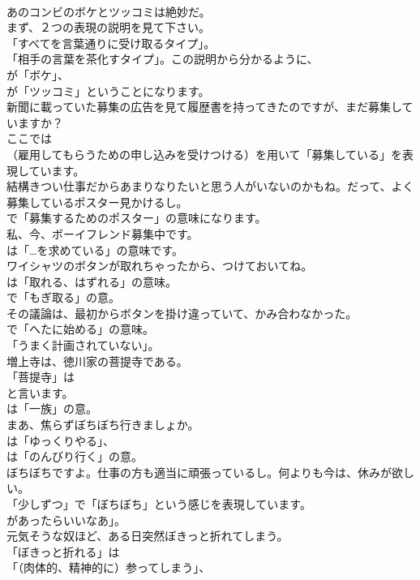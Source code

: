 \documentclass[8pt]{extreport}
\begin{document}
\begin{CJK}{UTF8}{min}
\\	あのコンビのボケとツッコミは絶妙だ。 
\\	まず、２つの表現の説明を見て下さい。
\\	「すべてを言葉通りに受け取るタイプ」。
\\	「相手の言葉を茶化すタイプ」。この説明から分かるように、
\\	が「ボケ」、
\\	が「ツッコミ」ということになります。	
\\	新聞に載っていた募集の広告を見て履歴書を持ってきたのですが、まだ募集していますか？ 
\\	ここでは 
\\	（雇用してもらうための申し込みを受けつける）を用いて「募集している」を表現しています。	
\\	結構きつい仕事だからあまりなりたいと思う人がいないのかもね。だって、よく募集しているポスター見かけるし。 
\\	で「募集するためのポスター」の意味になります。	
\\	私、今、ボーイフレンド募集中です。 
\\	は「…を求めている」の意味です。	
\\	ワイシャツのボタンが取れちゃったから、つけておいてね。 
\\	は「取れる、はずれる」の意味。
\\	で「もぎ取る」の意。	
\\	その議論は、最初からボタンを掛け違っていて、かみ合わなかった。 
\\	で「へたに始める」の意味。
\\	「うまく計画されていない」。	
\\	増上寺は、徳川家の菩提寺である。 
\\	「菩提寺」は
\\	と言います。
\\	は「一族」の意。	
\\	まあ、焦らずぼちぼち行きましょか。 
\\	は「ゆっくりやる」、
\\	は「のんびり行く」の意。	
\\	ぼちぼちですよ。仕事の方も適当に頑張っているし。何よりも今は、休みが欲しい。 
\\	「少しずつ」で「ぼちぼち」という感じを表現しています。
\\	があったらいいなあ」。	
\\	元気そうな奴ほど、ある日突然ぼきっと折れてしまう。 
\\	「ぼきっと折れる」は
\\	「（肉体的、精神的に）参ってしまう」、

\end{CJK}
\end{document}
